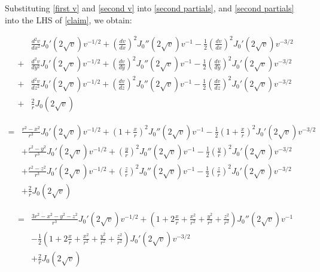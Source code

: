 \documentclass{article}
\begin{document}
\vskip 20pt

Substituting \eqref{first v} and \eqref{second v} into \eqref{second partials}, and \eqref{second partials}
into the LHS of \eqref{claim}, we obtain:

\begin{equation*}
\begin{aligned}
&\frac{d^2 v}{d x^2} J_0'(2\sqrt{v}) v^{-1/2} + \left(\frac{d v}{d x}\right)^2 J_0''(2\sqrt{v}) v^{-1} - \frac{1}{2} \left(\frac{d v}{d x}\right)^2 J_0'(2\sqrt{v}) v^{-3/2} \\
+& \frac{d^2 v}{d y^2} J_0'(2\sqrt{v}) v^{-1/2} + \left(\frac{d v}{d y}\right)^2 J_0''(2\sqrt{v}) v^{-1} - \frac{1}{2} \left(\frac{d v}{d y}\right)^2 J_0'(2\sqrt{v}) v^{-3/2} \\
+& \frac{d^2 v}{d z^2} J_0'(2\sqrt{v}) v^{-1/2} + \left(\frac{d v}{d z}\right)^2 J_0''(2\sqrt{v}) v^{-1} - \frac{1}{2} \left(\frac{d v}{d z}\right)^2 J_0'(2\sqrt{v}) v^{-3/2} \\
+& \frac{2}{r} J_0(2\sqrt{v})
\end{aligned}
\end{equation*}

\begin{equation*}
\begin{aligned}
=&\frac{r^2-x^2}{r^3} J_0'(2\sqrt{v}) v^{-1/2} + (1+\frac{x}{r})^2 J_0''(2\sqrt{v}) v^{-1} - \frac{1}{2} (1+\frac{x}{r})^2 J_0'(2\sqrt{v}) v^{-3/2} \\
&+ \frac{r^2-y^2}{r^3} J_0'(2\sqrt{v}) v^{-1/2} + \left(\frac{y}{r}\right)^2 J_0''(2\sqrt{v}) v^{-1} - \frac{1}{2} \left(\frac{y}{r}\right)^2 J_0'(2\sqrt{v}) v^{-3/2} \\
&+ \frac{r^2-z^2}{r^3} J_0'(2\sqrt{v}) v^{-1/2} + \left(\frac{z}{r}\right)^2 J_0''(2\sqrt{v}) v^{-1} - \frac{1}{2} \left(\frac{z}{r}\right)^2 J_0'(2\sqrt{v}) v^{-3/2} \\
&+ \frac{2}{r} J_0(2\sqrt{v})
\end{aligned}
\end{equation*}

\begin{equation*}
\begin{aligned}
=&\frac{3r^2-x^2-y^2-z^2}{r^3} J_0'(2\sqrt{v}) v^{-1/2} + (1+2\frac{x}{r} +\frac{x^2}{r^2} + \frac{y^2}{r^2} + \frac{z^2}{r^2}) J_0''(2\sqrt{v}) v^{-1} \\
&- \frac{1}{2} (1+2\frac{x}{r} +\frac{x^2}{r^2}+ \frac{y^2}{r^2} + \frac{z^2}{r^2}) J_0'(2\sqrt{v}) v^{-3/2} \\
&+ \frac{2}{r} J_0(2\sqrt{v})
\end{aligned}
\end{equation*}
\end{document}
